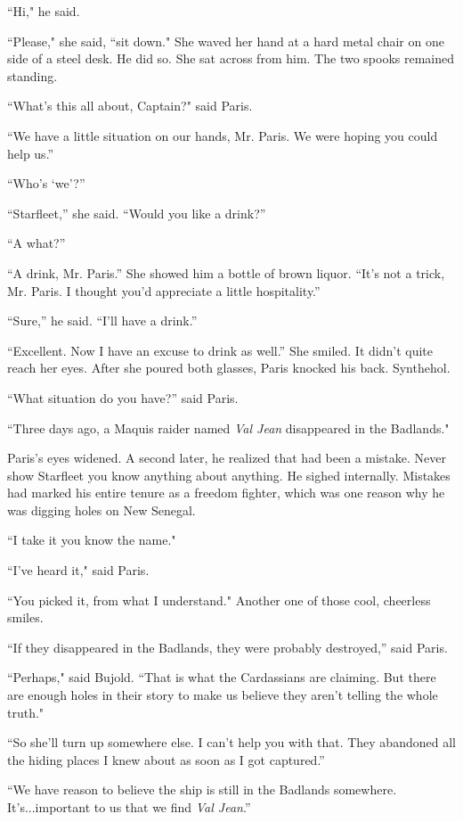 \documentclass[twoside,letterpaper,12pt]{memoir}
\begin{document}
``Hi," he said.

``Please," she said, ``sit down." She waved her hand at a hard metal chair on one side of a steel desk. He did so. She sat across from him. The two spooks remained standing.

``What's this all about, Captain?" said Paris.

``We have a little situation on our hands, Mr. Paris. We were hoping you could help us.''

``Who's ‘we'?''

``Starfleet,'' she said. ``Would you like a drink?''

``A what?''

``A drink, Mr. Paris.'' She showed him a bottle of brown liquor. ``It's not a trick, Mr. Paris. I thought you'd appreciate a little hospitality.''

``Sure,'' he said. ``I'll have a drink.''

``Excellent. Now I have an excuse to drink as well.'' She smiled. It didn't quite reach her eyes. After she poured both glasses, Paris knocked his back. Synthehol.

``What situation do you have?'' said Paris.

``Three days ago, a Maquis raider named \textit{Val Jean} disappeared in the Badlands."

Paris's eyes widened. A second later, he realized that had been a mistake. Never show Starfleet you know anything about anything. He sighed internally. Mistakes had marked his entire tenure as a freedom fighter, which was one reason why he was digging holes on New Senegal.

``I take it you know the name."

``I've heard it," said Paris.

``You picked it, from what I understand." Another one of those cool, cheerless smiles.

``If they disappeared in the Badlands, they were probably destroyed,'' said Paris.

``Perhaps," said Bujold. ``That is what the Cardassians are claiming. But there are enough holes in their story to make us believe they aren't telling the whole truth."

``So she'll turn up somewhere else. I can't help you with that. They abandoned all the hiding places I knew about as soon as I got captured.''

``We have reason to believe the ship is still in the Badlands somewhere. It's...important to us that we find \textit{Val Jean}.''
\end{document}
